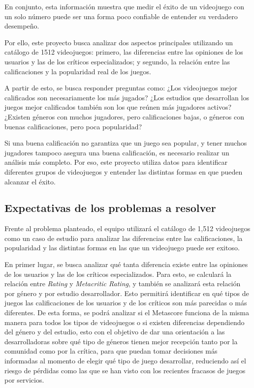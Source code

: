 \documentclass[letterpaper,11pt]{article}
\begin{document}
En conjunto, esta información muestra que medir el éxito de un videojuego con un solo número puede ser una forma poco confiable de entender su verdadero desempeño.

Por ello, este proyecto busca analizar dos aspectos principales utilizando un catálogo de 1512 videojuegos: primero, las diferencias entre las opiniones de los usuarios y las de los críticos especializados; y segundo, la relación entre las calificaciones y la popularidad real de los juegos.

A partir de esto, se busca responder preguntas como: ¿Los videojuegos mejor calificados son necesariamente los más jugados? ¿Los estudios que desarrollan los juegos mejor calificados también son los que reúnen más jugadores activos? ¿Existen géneros con muchos jugadores, pero calificaciones bajas, o géneros con buenas calificaciones, pero poca popularidad?

Si una buena calificación no garantiza que un juego sea popular, y tener muchos jugadores tampoco asegura una buena calificación, es necesario realizar un análisis más completo. Por eso, este proyecto utiliza datos para identificar diferentes grupos de videojuegos y entender las distintas formas en que pueden alcanzar el éxito.

\subsection*{Expectativas de los problemas a resolver}

Frente al problema planteado, el equipo utilizará el catálogo de 1{,}512 videojuegos como un caso de estudio para analizar las diferencias entre las calificaciones, la popularidad y las distintas formas en las que un videojuego puede ser exitoso.

En primer lugar, se busca analizar qué tanta diferencia existe entre las opiniones de los usuarios y las de los críticos especializados. Para esto, se calculará la relación entre \textit{Rating} y \textit{Metacritic Rating}, y también se analizará esta relación por género y por estudio desarrollador. Esto permitirá identificar en qué tipos de juegos las calificaciones de los usuarios y de los críticos son más parecidas o más diferentes. De esta forma, se podrá analizar si el Metascore funciona de la misma manera para todos los tipos de videojuegos o si existen diferencias dependiendo del género y del estudio,
esto con el objetivo de dar una orientación a las desarrolladoras sobre qué tipo de géneros tienen mejor recepción tanto por la comunidad como por la crítica, para que puedan tomar decisiones más informadas al momento de elegir qué tipo de juego desarrollar, reduciendo así el riesgo de pérdidas como las que se han visto con los recientes fracasos de juegos por servicios.
\end{document}
